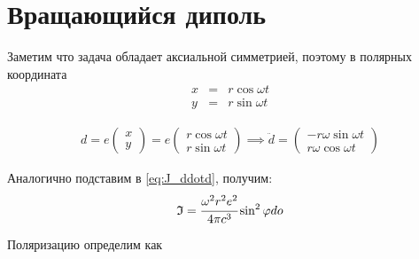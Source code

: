 \section{Вращающийся диполь}
Заметим что задача обладает аксиальной симметрией, поэтому в полярных координата
\begin{eqnarray}
    x &=& r \cos \omega t\\
    y &=& r \sin \omega t
\end{eqnarray}

\begin{gather}
    d = e
    \begin{pmatrix}
        x \\ y
    \end{pmatrix}
    = e
    \begin{pmatrix}
        r\cos \omega t \\ r\sin \omega t
    \end{pmatrix}
    \implies 
    \ddot d =
    \begin{pmatrix}
        -r \omega \sin \omega t \\ r \omega \cos \omega t
    \end{pmatrix}
\end{gather}

Аналогично подставим в \ref{eq:J_ddotd}, получим:
\begin{eqnarray}
    \mathfrak{I} = \cfrac{\omega^2 r^2 e^2 }{4\pi c^3} \sin^2 \phi do
\end{eqnarray}

Поляризацию определим как 








